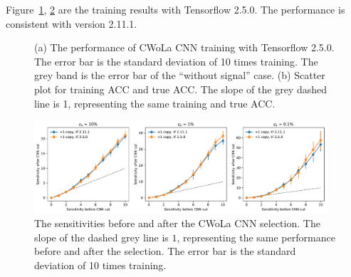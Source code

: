 \documentclass[12pt]{article}
\begin{document}
            Figure~\ref{fig:cwola_cnn_training_performance_copy_1_tf_250}, \ref{fig:sensitivity_improvement_bkg_eff_tf_250} are the training results with Tensorflow 2.5.0. The performance is consistent with version 2.11.1.
            \begin{figure}[htpb]
                \centering
                \caption{(a) The performance of CWoLa CNN training with Tensorflow 2.5.0. The error bar is the standard deviation of 10 times training. The grey band is the error bar of the ``without signal'' case. (b) Scatter plot for training ACC and true ACC. The slope of the grey dashed line is 1, representing the same training and true ACC.}
                \label{fig:cwola_cnn_training_performance_copy_1_tf_250}
            \end{figure}

            \begin{figure}[htpb]
                \centering
                \includegraphics[width=0.97\textwidth]{HVmodel_sensitivity_improvement_bkg_eff_copy_1_tf_250.pdf}
                \caption{The sensitivities before and after the CWoLa CNN selection. The slope of the dashed grey line is $1$, representing the same performance before and after the selection. The error bar is the standard deviation of 10 times training.}
                \label{fig:sensitivity_improvement_bkg_eff_tf_250}
            \end{figure}
\end{document}
